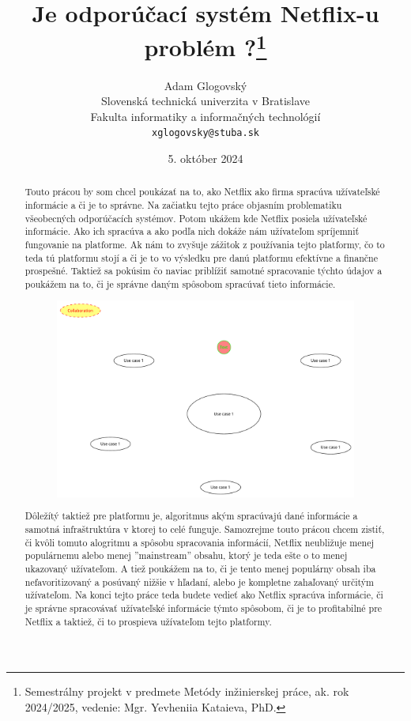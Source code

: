 \documentclass[10pt,twoside,slovak,a4paper]{article}
\title{Je odporúčací systém Netflix-u problém ?\thanks{Semestrálny projekt v predmete Metódy inžinierskej práce, ak. rok 2024/2025, vedenie: Mgr. Yevheniia Kataieva, PhD.}}
\author{Adam Glogovský\\[2pt]
	{\small Slovenská technická univerzita v Bratislave}\\
	{\small Fakulta informatiky a informačných technológií}\\
	{\small \texttt{xglogovsky@stuba.sk}}}
\date{\small 5. október 2024}
\begin{document}
\maketitle
\begin{abstract}


	Touto prácou by som chcel poukázať na to, ako Netflix ako firma spracúva užívateľské informácie a či je to správne. Na začiatku tejto práce objasním problematiku všeobecných odporúčacích systémov. Potom ukážem kde Netflix posiela užívateľské informácie. Ako ich spracúva a ako podľa nich dokáže nám užívateľom spríjemniť fungovanie na platforme. Ak nám to zvyšuje zážitok z používania tejto platformy, čo to teda tú platformu stojí a či je to vo výsledku pre danú platformu efektívne a finančne prospešné. Taktiež sa pokúsim čo naviac priblížiť samotné spracovanie týchto údajov a poukážem na to, či je správne daným spôsobom spracúvať tieto informácie.\cite{amatriain2015recommender}
	\begin{figure}[h]
		\centering
		\includegraphics[scale=0.2]{diagram.pdf}
	\end{figure}
	Dôležítý taktiež pre platformu je, algoritmus akým spracúvajú dané informácie a samotná infraštruktúra v ktorej to celé funguje. Samozrejme touto prácou chcem zistiť, či kvôli tomuto alogritmu a spôsobu spracovania informácií, Netflix neubližuje menej populárnemu alebo menej ''mainstream'' obsahu, ktorý je teda ešte o to menej ukazovaný užívateľom. A tiež poukážem na to, či je tento menej populárny obsah iba nefavoritizovaný a posúvaný nižšie v hľadaní, alebo je kompletne zahaľovaný určitým užívateľom. Na konci tejto práce teda budete vedieť ako Netflix spracúva informácie, či je správne spracovávať užívateľské informácie týmto spôsobom, či je to profitabilné pre Netflix a taktiež, či to prospieva užívateľom tejto platformy.\end{abstract}
\end{document}
